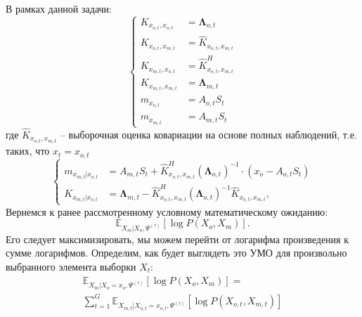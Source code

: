 \documentclass[11pt]{article}
\newcommand{\Expect}{\mathbb{E}}
\begin{document}
В рамках данной задачи:
\begin{equation}
\left\{ \begin{aligned} 
K_{x_{o,t},x_{o,t}} &= \mathbf{\Lambda}_{o,t} \\
K_{x_{o,t},x_{m,t}} &= \hat{K}_{x_{o,t},x_{m,t}} \\
K_{x_{m,t},x_{o,t}} &= \hat{K}^H_{x_{o,t},x_{m,t}} \\
K_{x_{m,t},x_{m,t}} &= \mathbf{\Lambda}_{m,t} \\
m_{x_{o,t}} &= A_{o,t}S_t \\
m_{x_{m,t}} &= A_{m,t}S_t
\end{aligned} \right.
\end{equation}
где $\hat{K}_{x_{o,t},x_{m,t}}$ -- выборочная оценка ковариации на основе полных наблюдений, т.е. таких, что $x_t = x_{o,t}$
\begin{equation}
\left\{ \begin{aligned} 
m_{x_{m,t}|x_{o,t}} &= A_{m,t}S_t + \hat{K}^H_{x_{o,t},x_{m,t}}(\mathbf{\Lambda}_{o,t})^{-1}\cdot(x_o-A_{o,t}S_t) \\
K_{x_{m,t}|x_{o,t}} &= \mathbf{\Lambda}_{m,t}-\hat{K}^H_{x_{o,t},x_{m,t}}(\mathbf{\Lambda}_{o,t})^{-1}\hat{K}_{x_{o,t},x_{m,t}},
\end{aligned} \right.
\end{equation}
Вернемся к ранее рассмотренному условному математическому ожиданию:
\begin{equation*}
 \Expect_{X_m|X_o, \Psi^{(\tau)}}[\log P(X_o, X_m)].
\end{equation*}
Его следует максимизировать, мы можем перейти от логарифма произведения к сумме логарифмов. Определим, как будет выглядеть это УМО для произвольно выбранного элемента выборки $X_t$:
\begin{equation*}
\begin{gathered}
 \Expect_{X_m|X_o=x_o, \Psi^{(\tau)}}[\log P(X_o, X_m)] = \\
 \sum_{t=1}^G\Expect_{X_{m,t}|X_{o,t}=x_{o,t}, \Psi^{(\tau)}}[\log P(X_{o,t}, X_{m,t})]
\end{gathered}
\end{equation*}
\\
\\
\end{document}
